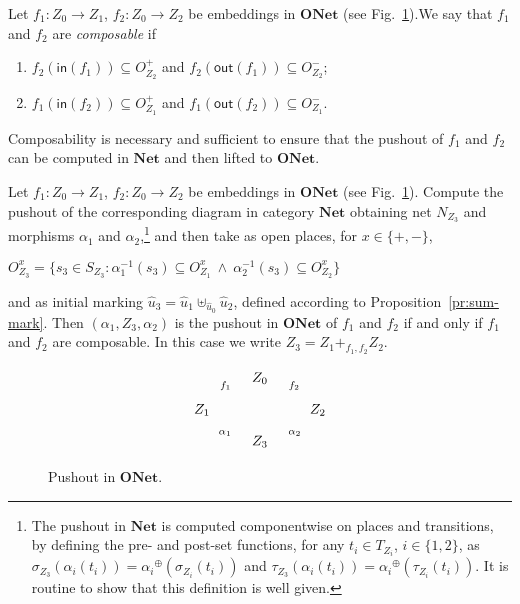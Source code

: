 \documentclass{LMCS}
\newcommand{\inp}[1]{\ensuremath{\mathsf{in}({#1})}}
\newcommand{\out}[1]{\ensuremath{\mathsf{out}({#1})}}
\newcommand{\init}[1]{\hat{#1}}
\newcommand{\mjoin}{\ensuremath{\uplus}}
\newcommand{\mon}[1]{\ensuremath{{#1}^\oplus}}
\newcommand{\comp}[1]{\ensuremath{+}_{#1}}
\newcommand{\onet}{\ensuremath{\mathbf{ONet}}}
\newcommand{\net}{\ensuremath{\mathbf{Net}}}
\begin{document}
\begin{defi}
  \label{de:composable}
  Let $f_1 : Z_0 \to Z_1$, $f_2 : Z_0 \to Z_2$ be embeddings in
  $\onet$ (see Fig.~\ref{fi:pushout-onet}).We say that $f_1$ and $f_2$ are \emph{composable} if
  \begin{enumerate}[(1)]
  \item
$f_2(\inp{f_1}) \subseteq O_{Z_2}^+$  and
    $f_2(\out{f_1}) \subseteq O_{Z_2}^-$;

  \item 
$f_1(\inp{f_2}) \subseteq O_{Z_1}^+$ and
    $f_1(\out{f_2}) \subseteq O_{Z_1}^-$.
  \end{enumerate}
\end{defi}

Composability is necessary and sufficient to ensure that the pushout
of $f_1$ and $f_2$ can be computed in $\net$ and then lifted to
$\onet$.

\begin{prop}[pushouts in $\onet$]
  \label{pr:push-onet}
  Let $f_1 : Z_0 \to Z_1$, $f_2 : Z_0 \to Z_2$ be
  embeddings in $\onet$ 
(see Fig.~\ref{fi:pushout-onet}).
Compute the pushout of the corresponding diagram in category $\net$
  obtaining net $N_{Z_3}$ and morphisms $\alpha_1$ and
  $\alpha_2$,\footnote{The pushout in $\net$ is computed componentwise
    on places and transitions, by defining the pre- and post-set
    functions, for any $t_i \in T_{Z_i}$, $i\in\{1,2\}$, as
    $\sigma_{Z_3}(\alpha_i(t_i)) = \mon{\alpha_i}(\sigma_{Z_i}(t_i))$
    and $\tau_{Z_3}(\alpha_i(t_i)) =
    \mon{\alpha_i}(\tau_{Z_i}(t_i))$. It is routine to show that this definition is well given.}
and then take as open places, for
  $x \in \{ +, -\}$,
  \begin{center}
    $O_{Z_3}^x = \{ s_3 \in S_{Z_3} : \alpha_1^{-1}(s_3) \subseteq
    O_{Z_1}^x\ \wedge\ \alpha_2^{-1}(s_3) \subseteq O_{Z_2}^x \}$
  \end{center}
  and as initial marking  $\init{u}_3 = \init{u}_1 \mjoin_{\init{u}_0}
  \init{u}_2$,  defined according to
  Proposition~\ref{pr:sum-mark}.
Then $(\alpha_1, Z_3, \alpha_2)$ is the pushout in $\onet$ of $f_1$
  and $f_2$ if and only if $f_1$ and $f_2$ are composable.
In this case we write $Z_3 = Z_1 \comp{f_1,f_2} Z_2$.
\end{prop}


  \begin{figure}[t]
  
  \[
  \xymatrix@R=3mm{
    {} & {Z_0} \ar[dr]^{f_2} \ar[dl]_{f_1} & {}\\
    {Z_1} \ar[dr]_{\alpha_1} & {} & {Z_2} \ar[dl]^{\alpha_2} \\
    {} & {Z_3} & {}
  }
  \]
  
  \caption{Pushout in $\onet$.}
  \label{fi:pushout-onet}
\end{figure}
\end{document}
